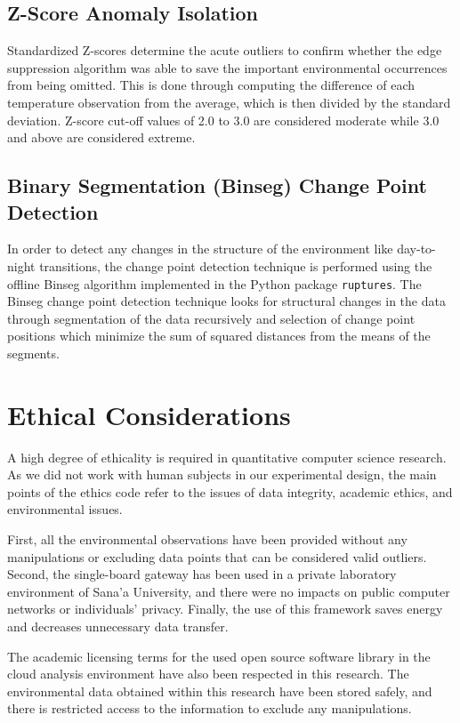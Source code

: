 \subsection{Z-Score Anomaly Isolation}
Standardized Z-scores determine the acute outliers to confirm whether the edge suppression algorithm was able to save the important environmental occurrences from being omitted. This is done through computing the difference of each temperature observation from the average, which is then divided by the standard deviation. Z-score cut-off values of 2.0 to 3.0 are considered moderate while 3.0 and above are considered extreme.

\subsection{Binary Segmentation (Binseg) Change Point Detection}
In order to detect any changes in the structure of the environment like day-to-night transitions, the change point detection technique is performed using the offline Binseg algorithm implemented in the Python package \texttt{ruptures}. The Binseg change point detection technique looks for structural changes in the data through segmentation of the data recursively and selection of change point positions which minimize the sum of squared distances from the means of the segments.

\section{Ethical Considerations}
\label{sec:ethics}
A high degree of ethicality is required in quantitative computer science research. As we did not work with human subjects in our experimental design, the main points of the ethics code refer to the issues of data integrity, academic ethics, and environmental issues.

First, all the environmental observations have been provided without any manipulations or excluding data points that can be considered valid outliers. Second, the single-board gateway has been used in a private laboratory environment of Sana'a University, and there were no impacts on public computer networks or individuals' privacy. Finally, the use of this framework saves energy and decreases unnecessary data transfer.

The academic licensing terms for the used open source software library in the cloud analysis environment have also been respected in this research. The environmental data obtained within this research have been stored safely, and there is restricted access to the information to exclude any manipulations.

